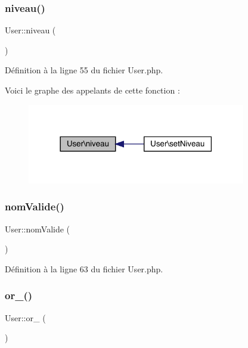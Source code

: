 \subsubsection{\texorpdfstring{niveau()}{niveau()}}
{\footnotesize\ttfamily User\+::niveau (\begin{DoxyParamCaption}{ }\end{DoxyParamCaption})}



Définition à la ligne 55 du fichier User.\+php.

Voici le graphe des appelants de cette fonction \+:\nopagebreak
\begin{figure}[H]
\begin{center}
\leavevmode
\includegraphics[width=270pt]{class_user_ab341c8493decd7ed8ad872544a3b3332_icgraph}
\end{center}
\end{figure}
\mbox{\label{class_user_a786a3c86445a30cddb0e1d4b73f133ec}} 
\subsubsection{\texorpdfstring{nom\+Valide()}{nomValide()}}
{\footnotesize\ttfamily User\+::nom\+Valide (\begin{DoxyParamCaption}{ }\end{DoxyParamCaption})}



Définition à la ligne 63 du fichier User.\+php.

\mbox{\label{class_user_a1323f270a1285588987ef21bf704975c}} 
\subsubsection{\texorpdfstring{or\+\_\+()}{or\_()}}
{\footnotesize\ttfamily User\+::or\+\_\+ (\begin{DoxyParamCaption}{ }\end{DoxyParamCaption})}



